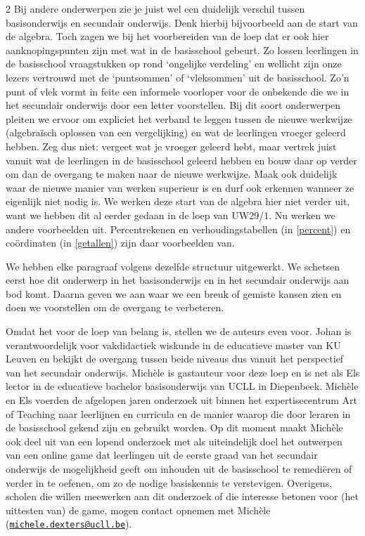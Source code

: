 \begin{multicols}{2}
Bij andere onderwerpen zie je juist wel een duidelijk verschil tussen basisonderwijs en secundair onderwijs.
Denk hierbij bijvoorbeeld aan de start van de algebra.
Toch zagen we bij het voorbereiden van de loep dat er ook hier aanknopingspunten zijn met wat in de basisschool gebeurt.
Zo lossen leerlingen in de basisschool vraagstukken op rond `ongelijke verdeling' en wellicht zijn onze lezers vertrouwd met de `puntsommen' of `vleksommen' uit de basisschool.
Zo'n punt of vlek vormt in feite een informele voorloper voor de onbekende die we in het secundair onderwijs door een letter voorstellen.
Bij dit soort onderwerpen pleiten we ervoor om expliciet het verband te leggen tussen de nieuwe werkwijze (algebraïsch oplossen van een vergelijking) en wat de leerlingen vroeger geleerd hebben.
Zeg dus niet: vergeet wat je vroeger geleerd hebt, maar vertrek juist vanuit wat de leerlingen in de basisschool geleerd hebben en bouw daar op verder om dan de overgang te maken naar de nieuwe werkwijze.
Maak ook duidelijk waar de nieuwe manier van werken superieur is en durf ook erkennen wanneer ze eigenlijk niet nodig is.
We werken deze start van de algebra hier niet verder uit, want we hebben dit al eerder gedaan in de loep van UW29/1.
Nu werken we andere voorbeelden uit.
Percentrekenen en verhoudingstabellen (in \autoref{percent}) en coördinaten (in \autoref{getallen}) zijn daar voorbeelden van.

We hebben elke paragraaf volgens dezelfde structuur uitgewerkt.
We schetsen eerst hoe dit onderwerp in het basisonderwijs en in het secundair onderwijs aan bod komt.
Daarna geven we aan waar we een breuk of gemiste kansen zien en doen we voorstellen om de overgang te verbeteren.

Omdat het voor de loep van belang is, stellen we de auteurs even voor.
Johan is verantwoordelijk voor vakdidactiek wiskunde in de educatieve master van KU Leuven en bekijkt de overgang tussen beide niveaus dus vanuit het perspectief van het secundair onderwijs.
Michèle is gastauteur voor deze loep en is net als Els lector in de educatieve bachelor basisonderwijs van UCLL in Diepenbeek.
Michèle en Els voerden de afgelopen jaren onderzoek uit binnen het expertisecentrum Art of Teaching naar leerlijnen en curricula en de manier waarop die door leraren in de basisschool gekend zijn en gebruikt worden.
Op dit moment maakt Michèle ook deel uit van een lopend onderzoek met als uiteindelijk doel het ontwerpen van een online game dat leerlingen uit de eerste graad van het secundair onderwijs de mogelijkheid geeft om inhouden uit de basisschool te remediëren of verder in te oefenen, om zo de nodige basiskennis te verstevigen.
Overigens, scholen die willen meewerken aan dit onderzoek of die interesse betonen voor (het uittesten van) de game, mogen contact opnemen met Michèle (\href{mailto:michele.dexters@ucll.be}{\nolinkurl{michele.dexters@ucll.be}}).


\end{multicols}
